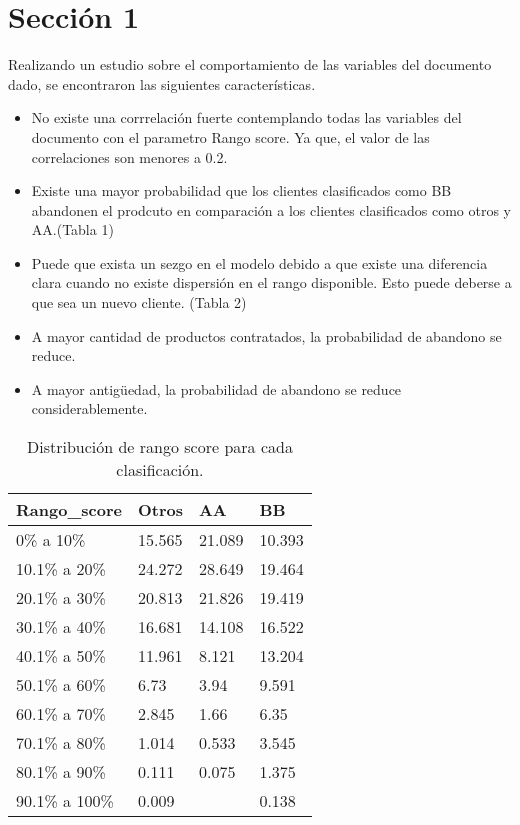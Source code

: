 \documentclass[../main.tex]{subfiles}
\begin{document}
\section*{Sección 1}
Realizando un estudio sobre el comportamiento de las variables del documento dado, se encontraron las siguientes características.
\begin{itemize}
    \item No existe una corrrelación fuerte contemplando todas las variables del documento con el parametro Rango score. Ya que, el valor de las correlaciones son menores a 0.2.
    \item Existe una mayor probabilidad que los clientes clasificados como BB abandonen el prodcuto en comparación a los clientes clasificados como otros y AA.(Tabla 1)
    \item Puede que exista un sezgo en el modelo debido a que existe una diferencia clara cuando no existe dispersión en el rango disponible. Esto puede deberse a que sea un nuevo cliente. (Tabla 2)
    \item A mayor cantidad de productos contratados, la probabilidad de abandono se reduce.
    \item A mayor antigüedad, la probabilidad de abandono se reduce considerablemente.
\end{itemize}
\begin{table}[htb]
    \centering
    \begin{tabular}{llll}
        \hline
        Rango\_score   & Otros  & AA     & BB     \\ \hline
        0\% a 10\%     & 15.565 & 21.089 & 10.393 \\
        10.1\% a 20\%  & 24.272 & 28.649 & 19.464 \\
        20.1\% a 30\%  & 20.813 & 21.826 & 19.419 \\
        30.1\% a 40\%  & 16.681 & 14.108 & 16.522 \\
        40.1\% a 50\%  & 11.961 & 8.121  & 13.204 \\
        50.1\% a 60\%  & 6.73   & 3.94   & 9.591  \\
        60.1\% a 70\%  & 2.845  & 1.66   & 6.35   \\
        70.1\% a 80\%  & 1.014  & 0.533  & 3.545  \\
        80.1\% a 90\%  & 0.111  & 0.075  & 1.375  \\
        90.1\% a 100\% & 0.009  &        & 0.138  \\ \hline
    \end{tabular}
    \caption{Distribución de rango score para cada clasificación.}
\end{table}
\end{document}
